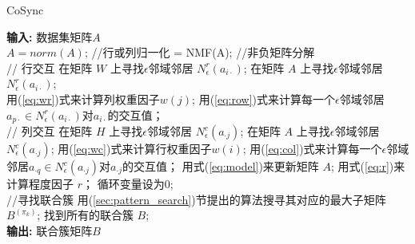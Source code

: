 {\renewcommand\baselinestretch{1.0}\selectfont  %
\begin{algorithm}[!t]
\caption{CoSync}
\label{alg:CoSync}
\begin{algorithmic}[1]
\small{
\STATE \textbf{输入:} 数据集矩阵$A$\\[1ex]
\STATE $A = norm(A)$; //行或列归一化
    \STATE [W, H] = NMF(A); //非负矩阵分解
\ENDIF \\[1ex]
    \STATE // 行交互
            \STATE 在矩阵 $W$ 上寻找$\epsilon$邻域邻居 $N_{\epsilon}^{r}(a_{i\cdot})$;
        \ELSE
            \STATE 在矩阵 $A$ 上寻找$\epsilon$邻域邻居 $N_{\epsilon}^{r}(a_{i\cdot})$;
        \ENDIF\\[1ex]
            \STATE 用(\ref{eq:wr})式来计算列权重因子$w(j)$;
        \ENDFOR
        \STATE 用(\ref{eq:row})式来计算每一个$\epsilon$邻域邻居$a_{p\cdot}\in N_{\epsilon}^{r}(a_{i\cdot})$对$a_{i\cdot}$的交互值；
    \ENDFOR\\[1ex]
    \STATE // 列交互
            \STATE 在矩阵 $H$ 上寻找$\epsilon$邻域邻居 $N_{\epsilon}^{c}(a_{\cdot{}j})$;
        \ELSE
            \STATE 在矩阵 $A$ 上寻找$\epsilon$邻域邻居 $N_{\epsilon}^{c}(a_{\cdot{}j})$;
        \ENDIF
            \STATE 用(\ref{eq:wc})式来计算行权重因子$w(i)$;
        \ENDFOR
        \STATE 用(\ref{eq:col})式来计算每一个$\epsilon$邻域邻居$a_{\cdot{}q}\in N_{\epsilon}^{c}(a_{\cdot{}j})$对$a_{\cdot{}j}$的交互值；
    \ENDFOR
    \STATE 用式(\ref{eq:model})来更新矩阵 $A$;
    \STATE 用式(\ref{eq:r})来计算程度因子 $r$；
        \STATE 循环变量设为$0$;
     \ENDIF
 \ENDWHILE\\[1ex]
\STATE //寻找联合簇
         \STATE 用(\ref{sec:pattern_search})节提出的算法搜寻其对应的最大子矩阵$B^{(\pi_k)}$;
     \ENDFOR
      \STATE 找到所有的联合簇 $B$;\\[1ex]
\STATE \textbf{输出:} 联合簇矩阵$B$
}
\end{algorithmic}
\end{algorithm}
\par} %

\vspace{-2mm}
